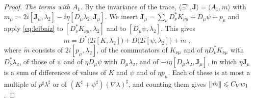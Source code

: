 \documentclass[11pt]{preprint}
\DeclarePairedDelimiter{\norm}{\lVert}{\rVert}
\numberwithin{equation}{section}
\begin{document}
\begin{proof}
\emph{The terms with $A_1$.} By the invariance of the trace, $\langle\Xi^{\mathrm a}, \mathbf J\rangle = \langle A_1, m\rangle$ with $m_\mu \coloneqq 2i[\mathbf J_\mu, \lambda_2] - i\eta[D_\mu\lambda_2, \mathbf J_\mu]$. We insert $\mathbf J_\mu = \sum_\nu D^*_\nu K_{\nu\mu} + D_\mu\psi + p_\mu$ and apply \eqref{eq:leibniz} to $[D^*_\nu K_{\nu\mu}, \lambda_2]$ and to $[D_\mu\psi, \lambda_2]$. This gives
\[
    m = D^*\bigl(2i[K, \lambda_2]\bigr) + D\bigl(2i[\psi, \lambda_2]\bigr) + \tilde m\;,
\]
where $\tilde m$ consists of $2i[p_\mu, \lambda_2]$, of the commutators of $K_{\nu\mu}$ and of $\eta D^*_\nu K_{\nu\mu}$ with $D^*_\nu\lambda_2$, of those of $\psi$ and of $\eta D_\mu\psi$ with $D_\mu\lambda_2$, and of $-i\eta[D_\mu\lambda_2, \mathbf J_\mu]$, in which $\eta\mathbf J_\mu$ is a sum of differences of values of $K$ and $\psi$ and of $\eta p_\mu$. Each of these is at most a multiple of $p^\sharp\lambda^\sharp$ or of $(K^\sharp + \psi^\sharp)(\nabla\lambda)^\sharp$, and counting them gives $\norm{\tilde m} \leqslant C_Vw_1$.


\end{proof}
\end{document}
